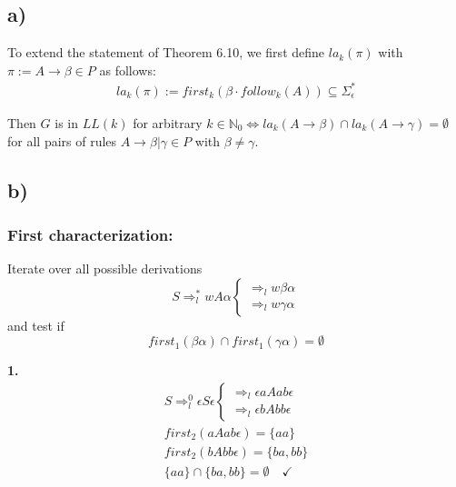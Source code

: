 \subsection*{a)}

To extend the statement of Theorem 6.10, we first define $la_k(\pi)$ with $\pi := A \rightarrow \beta \in P$ as follows:
\begin{equation*}\begin{split}
la_k(\pi) := first_k(\beta \cdot follow_k(A)) \subseteq \Sigma_{\epsilon}^*
\end{split}\end{equation*}

Then $G$ is in $LL(k)$ for arbitrary $k \in \mathbb{N}_0 \Leftrightarrow la_k(A \rightarrow \beta) \cap la_k(A \rightarrow \gamma) = \emptyset$ for all pairs of rules $A \rightarrow \beta | \gamma \in P$ with $\beta \neq \gamma$.

\subsection*{b)}

\subsubsection*{First characterization:}

Iterate over all possible derivations \begin{equation*}
S \Rightarrow_l^{*} wA\alpha \begin{cases}\Rightarrow_l w\beta\alpha\\ \Rightarrow_l w\gamma\alpha\end{cases}
\end{equation*} and test if \begin{equation*}
first_1(\beta\alpha) \cap first_1(\gamma\alpha) = \emptyset
\end{equation*}

\textbf{1.}
\begin{equation*}
\begin{split}
S \Rightarrow_l^{0} \epsilon S\epsilon \begin{cases}\Rightarrow_l \epsilon aAab\epsilon\\ \Rightarrow_l \epsilon bAbb\epsilon\end{cases} \\
first_2(aAab\epsilon) = \{aa\} \\
first_2(bAbb\epsilon) = \{ba, bb\} \\
\{aa\} \cap \{ba, bb\} = \emptyset \quad \checkmark
\end{split}
\end{equation*}

